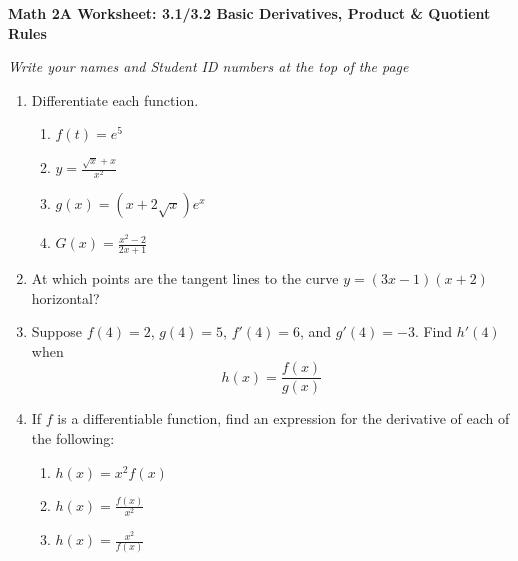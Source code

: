 \documentclass[12pt,fleqn]{article}
\begin{document}
\begin{center}
	\textbf{Math 2A Worksheet: 3.1/3.2 Basic Derivatives, Product \& Quotient Rules}
\end{center}

\emph{Write your names and Student ID numbers at the top of the page}

\begin{enumerate}
\item Differentiate each function.
\begin{enumerate}
\item $f(t)=e^5$\vfill


\item $y=\displaystyle\frac{\sqrt{x}+x}{x^2}$\vfill

\item $g(x)=(x+2\sqrt{x})e^x$\vfill

\item $G(x)=\displaystyle\frac{x^2-2}{2x+1}$\vfill
\end{enumerate}

\item At which points are the tangent lines to the curve $y=(3x-1)(x+2)$ horizontal?\vfill


\newpage
\item Suppose $f(4)=2$, $g(4)=5$, $f'(4)=6$, and $g'(4)=-3$.  Find $h'(4)$ when
\[h(x)=\displaystyle\frac{f(x)}{g(x)}\]

\vfill

\item If $f$ is a differentiable function, find an expression for the derivative of each of the following:
\begin{enumerate}
\item $h(x)=x^2f(x)$\vfill

\item $h(x)=\displaystyle\frac{f(x)}{x^2}$\vfill

\item $h(x)=\displaystyle\frac{x^2}{f(x)}$\vfill

\end{enumerate}
\end{enumerate}
\end{document}
